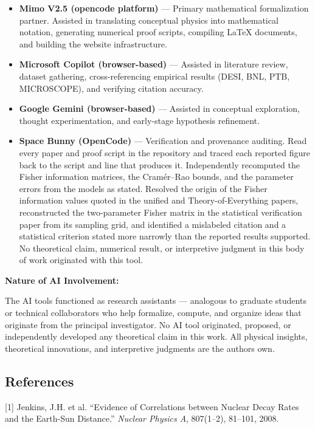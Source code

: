 \documentclass[
  10pt,
]{article}
\providecommand{\tightlist}{%
  \setlength{\itemsep}{0pt}\setlength{\parskip}{0pt}}
\begin{document}
\begin{itemize}
\tightlist
\item
  \textbf{Mimo V2.5 (opencode platform)} --- Primary mathematical
  formalization partner. Assisted in translating conceptual physics into
  mathematical notation, generating numerical proof scripts, compiling
  LaTeX documents, and building the website infrastructure.
\item
  \textbf{Microsoft Copilot (browser-based)} --- Assisted in literature
  review, dataset gathering, cross-referencing empirical results (DESI,
  BNL, PTB, MICROSCOPE), and verifying citation accuracy.
\item
  \textbf{Google Gemini (browser-based)} --- Assisted in conceptual
  exploration, thought experimentation, and early-stage hypothesis
  refinement.
\item
  \textbf{Space Bunny (OpenCode)} --- Verification and provenance
  auditing. Read every paper and proof script in the repository and
  traced each reported figure back to the script and line that produces
  it. Independently recomputed the Fisher information matrices, the
  Cramér--Rao bounds, and the parameter errors from the models as
  stated. Resolved the origin of the Fisher information values quoted in
  the unified and Theory-of-Everything papers, reconstructed the
  two-parameter Fisher matrix in the statistical verification paper from
  its sampling grid, and identified a mislabeled citation and a
  statistical criterion stated more narrowly than the reported results
  supported. No theoretical claim, numerical result, or interpretive
  judgment in this body of work originated with this tool.
\end{itemize}

\textbf{Nature of AI Involvement:}

The AI tools functioned as research assistants --- analogous to graduate
students or technical collaborators who help formalize, compute, and
organize ideas that originate from the principal investigator. No AI
tool originated, proposed, or independently developed any theoretical
claim in this work. All physical insights, theoretical innovations, and
interpretive judgments are the author\textquotesingle s own.

\hypertarget{references}{%
\subsection{References}\label{references}}

{[}1{]} Jenkins, J.H. et al. ``Evidence of Correlations between Nuclear
Decay Rates and the Earth-Sun Distance.'' \emph{Nuclear Physics A},
807(1--2), 81--101, 2008.
\end{document}

